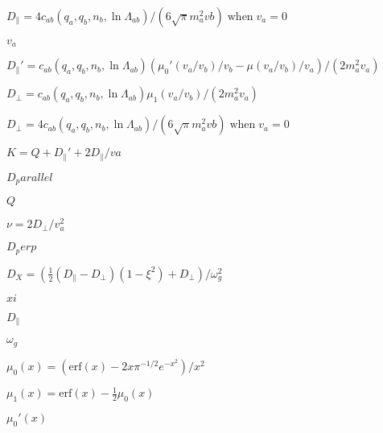\documentclass{article}
\begin{document}
$D_\parallel = 4c_{ab}(q_a,q_b,n_b,\ln\Lambda_{ab})/(6\sqrt{\pi}m_a^2vb) \;\mathrm{when}\; v_a=0$
\pagebreak

$v_a$
\pagebreak

$D_\parallel'=c_{ab}(q_a,q_b,n_b,\ln\Lambda_{ab})(\mu_0'(v_a/v_b)/v_b - \mu(v_a/v_b)/v_a)/(2m_a^2v_a)$
\pagebreak

$D_\perp=c_{ab}(q_a,q_b,n_b,\ln\Lambda_{ab})\mu_1(v_a/v_b) /(2m_a^2v_a)$
\pagebreak

$D_\perp = 4c_{ab}(q_a,q_b,n_b,\ln\Lambda_{ab})/(6\sqrt{\pi}m_a^2vb) \;\mathrm{when}\; v_a=0$
\pagebreak

$K = Q + D_\parallel' + 2D_\parallel/va$
\pagebreak

$D_parallel$
\pagebreak

$Q$
\pagebreak

$\nu = 2D_\perp/v_a^2$
\pagebreak

$D_perp$
\pagebreak

$D_X = (\frac{1}{2}(D_\parallel-D_\perp)(1-\xi^2) + D_\perp)/\omega_g^2$
\pagebreak

$xi$
\pagebreak

$D_\parallel$
\pagebreak

$\omega_g$
\pagebreak

$\mu_0(x) = (\mathrm{erf}(x) -2 x \pi^{-1/2} e^{-x^2})/x^2$
\pagebreak

$\mu_1(x) = \mathrm{erf}(x) - \frac{1}{2}\mu_0(x)$
\pagebreak

$\mu_0'(x)$
\pagebreak
\end{document}
